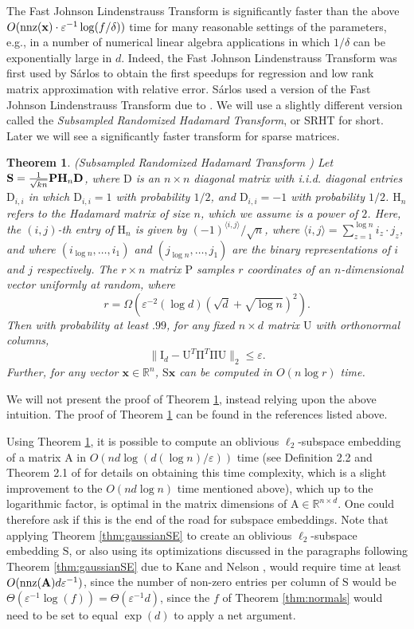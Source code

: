 \documentclass[11pt]{article}
\newtheorem{theorem}{Theorem}
\newcommand{\mat}[1]{{\ensuremath{\bm{\mathrm{#1}}}}}
\def\matA{\mat{A}}
\def\matD{\mat{D}}
\def\matH{\mat{H}}
\def\matI{\mat{I}}
\def\matP{\mat{P}}
\def\matS{\mat{S}}
\def\matU{\mat{U}}
\def\nnz{{ \rm nnz }}
\def\frac#1#2{{#1\over #2}}
\def\x{{\mathbf x}}
\newcommand{\eps}{\varepsilon}
\begin{document}
The Fast Johnson Lindenstrauss Transform 
is significantly faster than the above $O(\nnz(\x) \cdot \eps^{-1} \log(f/\delta))$ time for many
reasonable settings of the parameters, e.g., 
in a number of numerical linear algebra applications in which $1/\delta$ can be exponentially
large in $d$. Indeed, the Fast Johnson Lindenstrauss Transform was first used by S\'arlos to obtain the first speedups
for regression and low rank matrix approximation with relative error. S\'arlos used a version of the Fast Johnson
Lindenstrauss Transform due to \cite{AC06}. 
We will use a slightly different version called the {\em Subsampled
Randomized Hadamard Transform}, or SRHT for short. Later we will see a significantly faster transform for sparse
matrices. 

\begin{theorem}\label{thm:srht}(Subsampled Randomized Hadamard Transform 
\cite{AC06,S06,DMM06a,DMMS07,Tro11,DMMW12,ldfu13})
Let $\matS = \frac{1}{\sqrt{kn}} \matP \matH_n \matD$, where $\matD$ 
is an $n \times n$ diagonal matrix with i.i.d. diagonal
entries $\matD_{i,i}$ in which $\matD_{i,i} = 1$ with probability $1/2$, and $\matD_{i,i} = -1$ 
with probability $1/2$. 
$\matH_n$ refers to the Hadamard matrix of size $n$, which we assume is a power of $2$. Here, the $(i,j)$-th
entry of $\matH_n$ is given by $(-1)^{\langle i,j \rangle}/\sqrt{n}$, 
where $\langle i,j \rangle = \sum_{z=1}^{\log n} i_z \cdot j_z$,
and where $(i_{\log n}, \ldots, i_1)$ and $(j_{\log n}, \ldots, j_1)$ are the binary representations of $i$ and
$j$ respectively. The $r \times n$ matrix $\matP$ samples $r$ coordinates of an $n$-dimensional vector uniformly at random, 
where 
$$r = \Omega (\eps^{-2} (\log d)(\sqrt{d}+\sqrt{\log n})^2) .$$ 
Then with probability at least $.99$, for any fixed $n \times d$ matrix $\matU$ with orthonormal columns,
$$\|\matI_{d} - \matU^T\mat\Pi^T \mat\Pi \matU\|_2 \leq \eps.$$ 
Further, for any vector $\x \in \mathbb{R}^n$, $\matS \x$ can be computed in $O(n \log r)$ time. 
\end{theorem}
We will not present the proof of Theorem \ref{thm:srht}, instead relying upon the above intuition. The 
proof of Theorem \ref{thm:srht} can be found in the references listed above. 

Using Theorem \ref{thm:srht}, it is possible to compute an oblivious $\ell_2$-subspace embedding of a matrix $\matA$
in $O(n d \log(d(\log n)/\eps))$ time (see Definition 2.2 and Theorem 2.1 of \cite{AL08} for details on obtaining
this time complexity, which is a slight improvement to the $O(nd \log n)$ time mentioned above), which up to the logarithmic factor, is optimal in the matrix dimensions
of $\matA \in \mathbb{R}^{n \times d}$. One could therefore ask if this is the end of the road for subspace embeddings. 
Note that applying Theorem \ref{thm:gaussianSE} to create an oblivious $\ell_2$-subspace embedding $\matS$, 
or also using its optimizations discussed in the paragraphs following Theorem \ref{thm:gaussianSE} due to
Kane and Nelson \cite{kn14}, would
require time at least $O(\nnz(\matA) d \eps^{-1})$, since the number of non-zero entries per column of $\matS$
would be $\Theta(\eps^{-1} \log(f)) = \Theta(\eps^{-1} d)$, 
since the $f$ of Theorem \ref{thm:normals} would need to be set
to equal $\exp(d)$ to apply a net argument. 
\end{document}

